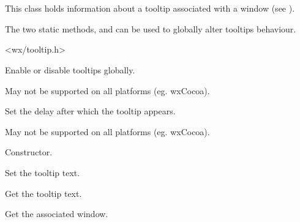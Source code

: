 \section{}\label{wxtooltip}

This class holds information about a tooltip associated with a window
(see ).

The two static methods,  and
 can be used to globally
alter tooltips behaviour.




<wx/tooltip.h>



\label{wxtooltipenable}


Enable or disable tooltips globally.

May not be supported on all platforms (eg. wxCocoa).


\label{wxtooltipsetdelay}


Set the delay after which the tooltip appears.

May not be supported on all platforms (eg. wxCocoa).

\label{wxtooltipwxtooltip}


Constructor.

\label{wxtooltipsettip}


Set the tooltip text.


\label{wxtooltipgettip}


Get the tooltip text.

\label{wxtooltipgetwindow}


Get the associated window.

